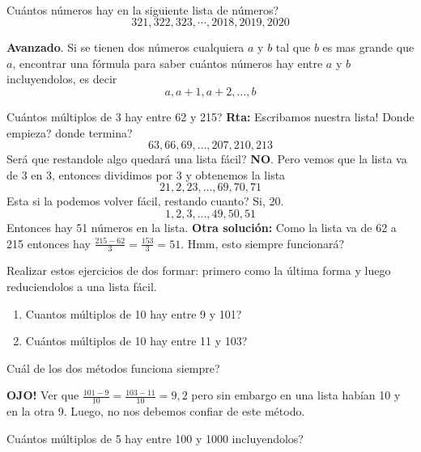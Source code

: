 \begin{exer}{\ \\}
	Cuántos números hay en la siguiente lista de números?
	\[321,322,323,\cdots, 2018,2019,2020\]
\end{exer}

\begin{exer}\label{ejercicio_cantidad_numeros_en_una_lista}
	\textbf{Avanzado}. Si se tienen dos números cualquiera $a$ y $b$ tal que $b$ es mas grande que $a$, encontrar una fórmula para saber cuántos números hay entre $a$ y $b$ incluyendolos, es decir
	\[
	a,a+1,a+2,\dots, b
	\]	
\end{exer}

\begin{ejemplo}
Cuántos múltiplos de 3 hay entre 62 y 215?
\textbf{Rta: } Escribamos nuestra lista! Donde empieza? donde termina?
\[
63,66,69,\dots , 207, 210,213
\]
Será que restandole algo quedará una lista fácil? \textbf{NO}. Pero vemos que la lista va de 3 en 3, entonces dividimos por 3 y  obtenemos la lista
\[
21,2,23,\dots , 69, 70,71
\]
Esta si la podemos volver fácil, restando cuanto? Si, 20.
\[
1,2,3,\dots,49,50,51
\]
Entonces hay 51 números en la lista.
\textbf{Otra solución: } 
Como la lista va de 62 a 215 entonces hay $\frac{215-62}{3}=\frac{153}{3}=51$. Hmm, esto siempre funcionará?
\end{ejemplo}


\begin{exer}
Realizar estos ejercicios de dos formar: primero como la última forma y luego reduciendolos a una lista fácil.
\begin{enumerate}[label=\Alph*)]
	\item Cuantos múltiplos de 10 hay entre 9 y 101?
	\item Cuántos múltiplos de 10 hay entre 11 y 103?
\end{enumerate}
Cuál de los dos métodos funciona siempre?
\end{exer}


\begin{tcolorbox}[colback=red!5!white,colframe=red!75!black]
	\textbf{OJO!} Ver que $\frac{101-9}{10}=\frac{103-11}{10}=9,2$ pero sin embargo en una lista habían 10 y en la otra 9. Luego, no nos debemos confiar de este método.
\end{tcolorbox}

\begin{ejemplo}
Cuántos múltiplos de 5 hay entre 100 y 1000 incluyendolos?
\end{ejemplo}

